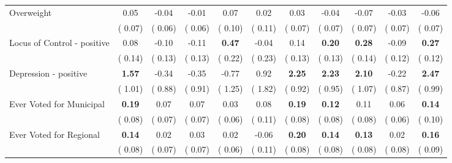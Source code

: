 \begin{tabular}{l c c c c c c c c c c}
Overweight &      0.05 &     -0.04 &     -0.01 &      0.07 &      0.02 &      0.03 &     -0.04 &     -0.07 &     -0.03 &     -0.06 \\
& (     0.07) & (     0.06) & (     0.06) & (     0.10) & (     0.11) & (     0.07) & (     0.07) & (     0.07) & (     0.07) & (     0.07) \\
Locus of Control - positive &      0.08 &     -0.10 &     -0.11 & \textbf{      0.47 } &     -0.04 &      0.14 & \textbf{      0.20 } & \textbf{      0.28 } &     -0.09 & \textbf{     0.27} \\
& (     0.14) & (     0.13) & (     0.13) & (     0.22) & (     0.23) & (     0.13) & (     0.13) & (     0.14) & (     0.12) & (     0.12) \\
Depression - positive & \textbf{      1.57 } &     -0.34 &     -0.35 &     -0.77 &      0.92 & \textbf{      2.25 } & \textbf{      2.23 } & \textbf{      2.10 } &     -0.22 & \textbf{     2.47} \\
& (     1.01) & (     0.88) & (     0.91) & (     1.25) & (     1.82) & (     0.92) & (     0.95) & (     1.07) & (     0.87) & (     0.99) \\
Ever Voted for Municipal & \textbf{      0.19 } &      0.07 &      0.07 &      0.03 &      0.08 & \textbf{      0.19 } & \textbf{      0.12 } &      0.11 &      0.06 & \textbf{     0.14} \\
& (     0.08) & (     0.07) & (     0.07) & (     0.06) & (     0.11) & (     0.08) & (     0.08) & (     0.08) & (     0.06) & (     0.10) \\
Ever Voted for Regional & \textbf{      0.14 } &      0.02 &      0.03 &      0.02 &     -0.06 & \textbf{      0.20 } & \textbf{      0.14 } & \textbf{      0.13 } &      0.02 & \textbf{     0.16} \\
& (     0.08) & (     0.07) & (     0.07) & (     0.06) & (     0.11) & (     0.08) & (     0.08) & (     0.08) & (     0.08) & (     0.09) \\
\bottomrule
\end{tabular}
